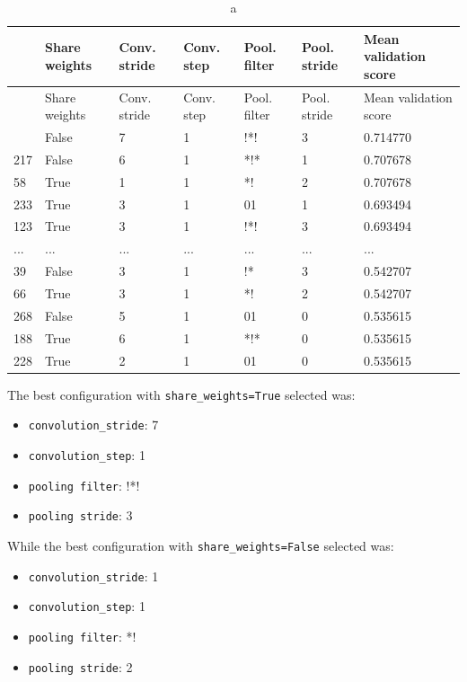 \documentclass[
  13pt,
  a4paper,
  DIV=11,
  numbers=noendperiod]{scrreprt}
\providecommand{\tightlist}{%
  \setlength{\itemsep}{0pt}\setlength{\parskip}{0pt}}\usepackage{longtable,booktabs,array}
\begin{document}
\begin{longtable}[]{@{}lllllll@{}}
\caption{a}\tabularnewline
\toprule\noalign{}
& Share weights & Conv. stride & Conv. step & Pool. filter & Pool.
stride & Mean validation score \\
\midrule\noalign{}
\endfirsthead
\toprule\noalign{}
& Share weights & Conv. stride & Conv. step & Pool. filter & Pool.
stride & Mean validation score \\
\midrule\noalign{}
\endhead
\bottomrule\noalign{}
\endlastfoot
167 & False & 7 & 1 & !*! & 3 & 0.714770 \\
217 & False & 6 & 1 & *!* & 1 & 0.707678 \\
58 & True & 1 & 1 & *! & 2 & 0.707678 \\
233 & True & 3 & 1 & 01 & 1 & 0.693494 \\
123 & True & 3 & 1 & !*! & 3 & 0.693494 \\
... & ... & ... & ... & ... & ... & ... \\
39 & False & 3 & 1 & !* & 3 & 0.542707 \\
66 & True & 3 & 1 & *! & 2 & 0.542707 \\
268 & False & 5 & 1 & 01 & 0 & 0.535615 \\
188 & True & 6 & 1 & *!* & 0 & 0.535615 \\
228 & True & 2 & 1 & 01 & 0 & 0.535615 \\
\end{longtable}

The best configuration with \texttt{share\_weights=True} selected was:

\begin{itemize}
\tightlist
\item
  \texttt{convolution\_stride}: 7
\item
  \texttt{convolution\_step}: 1
\item
  \texttt{pooling\ filter}: !*!
\item
  \texttt{pooling\ stride}: 3
\end{itemize}

While the best configuration with \texttt{share\_weights=False} selected
was:

\begin{itemize}
\tightlist
\item
  \texttt{convolution\_stride}: 1
\item
  \texttt{convolution\_step}: 1
\item
  \texttt{pooling\ filter}: *!
\item
  \texttt{pooling\ stride}: 2
\end{itemize}
\end{document}
